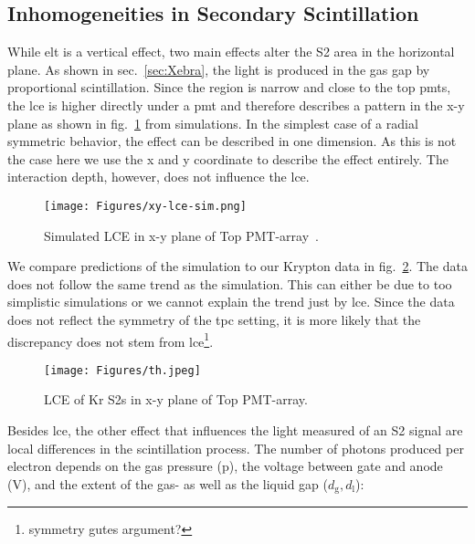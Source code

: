 
\FloatBarrier
\subsection{Inhomogeneities in Secondary Scintillation}
\label{ssec:scint-inhomo}
\FloatBarrier


While \gls{elt} is a vertical effect, two main effects alter the S2 area in the horizontal plane.
As shown in sec.~\ref{sec:Xebra}, the light is produced in the gas gap by proportional scintillation.
Since the region is narrow and close to the top \glspl{pmt}, the \gls{lce} is higher directly under a \gls{pmt} and therefore describes a pattern in the x-y plane as shown in fig.~\ref{fig:lce-xy-sim-alex} from simulations.
In the simplest case of a radial symmetric behavior, the effect can be described in one dimension.
As this is not the case here we use the x and y coordinate to describe the effect entirely.
The interaction depth, however, does not influence the \gls{lce}.

\begin{figure}
    \centering
    \texttt{[image: Figures/xy-lce-sim.png]}  %
    \caption[Simulated LCE in x-y plane of Top PMT-array]{
        Simulated LCE in x-y plane of Top PMT-array~\cite{ABism}.
    }
    \label{fig:lce-xy-sim-alex}
\end{figure}

We compare predictions of the simulation to our Krypton data in fig.~\ref{fig:S2-lce-x-y-krypton}.  %
The data does not follow the same trend as the simulation.
This can either be due to too simplistic simulations or we cannot explain the trend just by \gls{lce}.
Since the data does not reflect the symmetry of the \gls{tpc} setting, it is more likely that the discrepancy does not stem from \gls{lce}\footnote{symmetry gutes argument?}.

\begin{figure}
    \centering
    \texttt{[image: Figures/th.jpeg]}  %
    \caption[LCE of Kr S2s in x-y plane of Top PMT-array]{
        LCE of Kr S2s in x-y plane of Top PMT-array.
    }
    \label{fig:S2-lce-x-y-krypton}
\end{figure}

Besides \gls{lce}, the other effect that influences the light measured of an S2 signal are local differences in the scintillation process.
The number of photons produced per electron depends on the gas pressure (p), the voltage between gate and anode (V), and the extent of the gas- as well as the liquid gap ($ d_\mathrm{g}, d_\mathrm{l}$):


